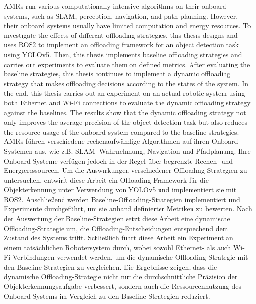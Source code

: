 {AMRs run various computationally intensive algorithms on their onboard systems, such as SLAM, perception, navigation, and path planning. However, their onboard systems usually have limited computation and energy resources. To investigate the effects of different offloading strategies, this thesis designs and uses ROS2 to implement an offloading framework for an object detection task using YOLOv5. Then, this thesis implements baseline offloading strategies and carries out experiments to evaluate them on defined metrics. After evaluating the baseline strategies, this thesis continues to implement a dynamic offloading strategy that makes offloading decisions according to the states of the system. In the end, this thesis carries out an experiment on an actual robotic system using both Ethernet and Wi-Fi connections to evaluate the dynamic offloading strategy against the baselines. The results show that the dynamic offloading strategy not only improves the average precision of the object detection task but also reduces the resource usage of the onboard system compared to the baseline strategies. 
}{%
%
AMRs führen verschiedene rechenaufwändige Algorithmen auf ihren Onboard-Systemen aus, wie z.B. SLAM, Wahrnehmung, Navigation und Pfadplanung. Ihre Onboard-Systeme verfügen jedoch in der Regel über begrenzte Rechen- und Energieressourcen. Um die Auswirkungen verschiedener Offloading-Strategien zu untersuchen, entwirft diese Arbeit ein Offloading-Framework für die Objekterkennung unter Verwendung von YOLOv5 und implementiert sie mit ROS2. Anschließend werden Baseline-Offloading-Strategien implementiert und Experimente durchgeführt, um sie anhand definierter Metriken zu bewerten. Nach der Auswertung der Baseline-Strategien setzt diese Arbeit eine dynamische Offloading-Strategie um, die Offloading-Entscheidungen entsprechend dem Zustand des Systems trifft. Schließlich führt diese Arbeit ein Experiment an einem tatsächlichen Robotersystem durch, wobei sowohl Ethernet- als auch Wi-Fi-Verbindungen verwendet werden, um die dynamische Offloading-Strategie mit den Baseline-Strategien zu vergleichen. Die Ergebnisse zeigen, dass die dynamische Offloading-Strategie nicht nur die durchschnittliche Präzision der Objekterkennungsaufgabe verbessert, sondern auch die Ressourcennutzung des Onboard-Systems im Vergleich zu den Baseline-Strategien reduziert.
}%
%
%
